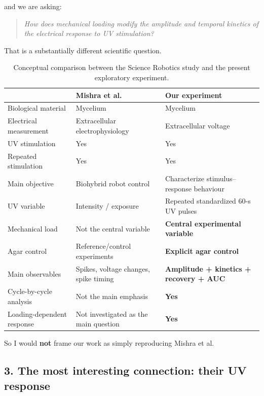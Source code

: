 \documentclass[11pt,a4paper]{article}
\begin{document}
and we are asking:

\begin{quote}
\emph{How does mechanical loading modify the amplitude and temporal kinetics
of the electrical response to UV stimulation?}
\end{quote}

That is a substantially different scientific question.

\begin{table}[H]
\centering
\small
\begin{tabular}{p{}p{}p{}}
\toprule
& Mishra et al. & Our experiment \\
\midrule
Biological material & Mycelium & Mycelium \\
Electrical measurement & Extracellular electrophysiology & Extracellular voltage \\
UV stimulation & Yes & Yes \\
Repeated stimulation & Yes & Yes \\
Main objective & Biohybrid robot control & Characterize stimulus--response behaviour \\
UV variable & Intensity / exposure & Repeated standardized 60-s UV pulses \\
Mechanical load & Not the central variable & \textbf{Central experimental variable} \\
Agar control & Reference/control experiments & \textbf{Explicit agar control} \\
Main observables & Spikes, voltage changes, spike timing & \textbf{Amplitude + kinetics + recovery + AUC} \\
Cycle-by-cycle analysis & Not the main emphasis & \textbf{Yes} \\
Loading-dependent response & Not investigated as the main question & \textbf{Yes} \\
\bottomrule
\end{tabular}
\caption{Conceptual comparison between the Science Robotics study and the
present exploratory experiment.}
\label{tab:comparison_mishra}
\end{table}

So I would \textbf{not} frame our work as simply reproducing Mishra et al.

\subsection{3. The most interesting connection: their UV response}
\end{document}
